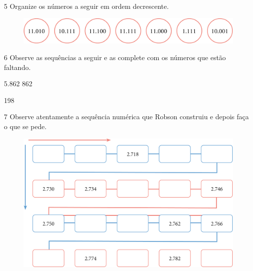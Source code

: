 \num{5} Organize os números a seguir em ordem decrescente.

\begin{figure}[htpb!]
\centering
\includegraphics[width=\textwidth]{media/image18.png}
\end{figure}



\num{6} Observe as sequências a seguir e as complete com os números que estão
faltando.

\begin{escolha}
\item 5.862   \quad {}\quad {}  862

\item 198   \quad {}
\end{escolha}

\pagebreak
\num{7} Observe atentamente a sequência numérica que Robson construiu e depois
faça o que se pede.

\begin{figure}[htpb!]
\centering
\includegraphics[width=\textwidth]{media/image17.png}
\end{figure}

